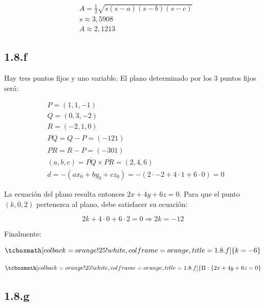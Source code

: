\documentclass{article}
\begin{document}
\begin{subequations}
\begin{align}
& A = \frac{1}{2} \sqrt{s (s-a) (s-b) (s-c)} \\
& s \approx 3,5908 \\
& A \approx 2,1213
\end{align}
\end{subequations}

\subsection*{1.8.f}
\label{subsec:1.8.f}

Hay tres puntos fijos y uno variable. El plano determinado por los 3 puntos fijos será:

\begin{subequations}
\begin{align}
& P = (1, 1, -1) \\
& Q = (0, 3, -2) \\
& R = (-2, 1, 0) \\
& \overline{PQ} = Q-P = (-1 2 1) \\
& \overline{PR} = R-P = (-3 0 1) \\
& (a,b,c) = \overline{PQ} \times \overline{PR} = (2, 4, 6) \\
& d = -(a x_0 + b y_0 + c z_0) = -(2 \cdot -2 + 4 \cdot 1 + 6 \cdot 0) = 0
\end{align}
\end{subequations}

La ecuación del plano resulta entonces $2x + 4y + 6z = 0$. Para que el punto $(k, 0, 2)$ pertenezca al plano, debe satisfacer su ecuación:

\begin{equation}
2k + 4 \cdot 0 + 6 \cdot 2 = 0 \Rightarrow 2k = -12
\end{equation}

Finalmente:

\begin{equation}
\tcboxmath[colback=orange!25!white,colframe=orange,title=1.8.f]
{ k = -6 }
\end{equation}

\begin{equation}
\tcboxmath[colback=orange!25!white,colframe=orange,title=1.8.f]
{ \Pi: \{ 2x + 4y + 6z = 0 }
\end{equation}

\subsection*{1.8.g}
\label{subsec:1.8.g}
\end{document}
